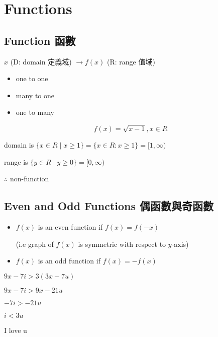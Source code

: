 %
%
\graphicspath{{./figures/basic/}}

\chapter{Functions}
\label{chap basics}

\section{Function 函數}
\begin{defn}{}
$x$ (D: domain 定義域) $\to f(x)$ (R: range 值域)
\begin{itemize}
\item one to one 
\item many to one
\item one to many
\end{itemize}
\end{defn}

\begin{eg}{}
$$f(x) = \sqrt{x - 1} , x \in R$$

domain is $\{x \in R \mid x \geq 1 \} = \{x \in R : x \geq 1\} = [1, \infty)$

range is $\{y \in R \mid y \geq 0 \} = [0, \infty)$

$\therefore$ non-function
\end{eg}

\section{Even and Odd Functions 偶函數與奇函數}
\begin{defn}{}
\begin{itemize}
\item $f(x)$ is an even function if $f(x) = f(-x)$

(i.e graph of $f(x)$ is symmetric with respect to $y$-axis)
\item $f(x)$ is an odd function if $f(x) = -f(x)$
\end{itemize}
\end{defn}{}

\begin{jk}{}
$9x - 7i > 3(3x-7u)$

$9x - 7i > 9x -21u$

$- 7i > -21 u$

$i < 3u$

I love u
\end{jk}
